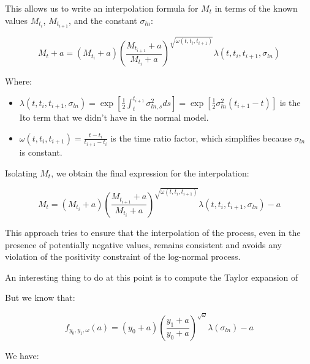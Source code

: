 \documentclass{article}
\begin{document}
This allows us to write an interpolation formula for \( M_t \) in terms of the known values \( M_{t_i} \), \( M_{t_{i+1}} \), and the constant \( \sigma_{ln} \):

\[
M_t + a = (M_{t_i} + a) \left( \frac{M_{t_{i+1}} + a}{M_{t_i} + a} \right)^{\sqrt{\omega(t, t_i, t_{i+1})}} \lambda(t, t_i, t_{i+1}, \sigma_{ln})
\]

Where:

\begin{itemize}
    \item $\lambda(t, t_i, t_{i+1}, \sigma_{ln}) = \exp\left[\frac{1}{2} \int _t ^{t_{i+1}}\sigma_{ln, s}^2 ds \right] = \exp\left[\frac{1}{2} \sigma_{ln}^2 (t_{i+1} - t) \right]$ is the Ito term that we didn't have in the normal model.
    \item $\omega(t, t_i, t_{i+1}) = \frac{t - t_i}{t_{i+1} - t_i}$ is the time ratio factor, which simplifies because \(\sigma_{ln}\) is constant.
\end{itemize}

Isolating \( M_t \), we obtain the final expression for the interpolation:

\[
M_t = (M_{t_i} + a) \left( \frac{M_{t_{i+1}} + a}{M_{t_i} + a} \right)^{\sqrt{\omega(t, t_i, t_{i+1})}} \lambda(t, t_i, t_{i+1}, \sigma_{ln}) - a
\]


This approach tries to ensure that the interpolation of the process, even in the presence of potentially negative values, remains consistent and avoids any violation of the positivity constraint of the log-normal process.



\indent An interesting thing to do at this point is to compute the Taylor expansion of 

But we know that:

$$
f_{y_0, y_1, \omega}(a) = \left(y_0 + a \right) \left( \frac{y_1 + a}{y_0 + a} \right)^{\sqrt \omega} \lambda(\sigma_{ln}) - a
$$

We have:
\end{document}
